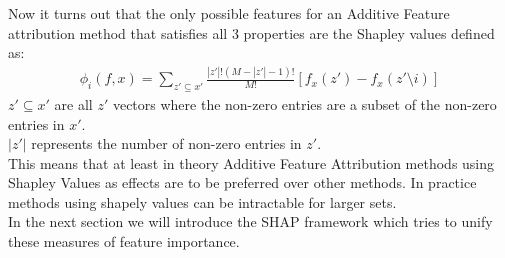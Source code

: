 \documentclass[conference]{IEEEtran}
\begin{document}
Now it turns out that the only possible features for an Additive Feature attribution method that satisfies all 3 properties are the Shapley values defined as:\\
\begin{align}\label{ShapleyEquation}
\phi_i(f, x) = \sum_{z' \subseteq x'} \frac{|z'|!(M - |z'| - 1)!}{M!}[f_x(z') - f_x(z' \setminus i)]
\end{align}
$z' \subseteq x'$ are all $z'$ vectors where the non-zero entries are a subset of the non-zero entries in $x'$.\\
$|z'|$ represents the number of non-zero entries in $z'$.\\

This means that at least in theory Additive Feature Attribution methods using Shapley Values as effects are to be preferred over other methods. 
In practice methods using shapely values can be intractable for larger sets.\\
In the next section we will introduce the SHAP framework which tries to unify these measures of feature importance.
\end{document}
